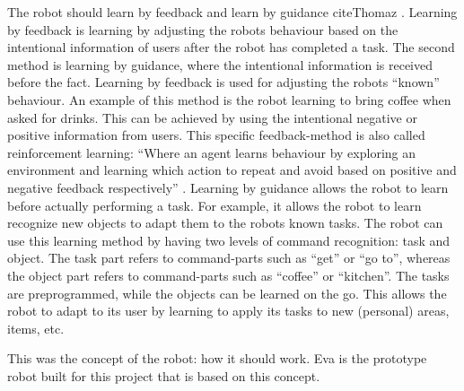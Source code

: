 \documentclass[project_eva.tex]{subfiles}
\begin{document}
The robot should learn by feedback and learn by guidance cite{Thomaz} . Learning by feedback is learning by adjusting the robot\textquotesingle s behaviour based on the intentional information of users after the robot has completed a task. The second method is learning by guidance, where the intentional information is received before the fact. Learning by feedback is used for adjusting the robot\textquotesingle s ``known'' behaviour. An example of this method is the robot learning to bring coffee when asked for drinks. This can be achieved by using the intentional negative or positive information from users.  This specific feedback-method is also called reinforcement learning: ``Where an agent learns behaviour by exploring an environment and learning which action to repeat and avoid based on positive and negative feedback respectively'' \cite{Joost}. 
Learning by guidance allows the robot to learn before actually performing a task. For example, it allows the robot to learn recognize new objects to adapt them to the robot\textquotesingle s known tasks. The robot can use this learning method by having two levels of command recognition: task and object. The task part refers to command-parts such as ``get'' or ``go to'', whereas the object part refers to command-parts such as ``coffee'' or ``kitchen''. The tasks are preprogrammed, while the objects can be learned on the go. This allows the robot to adapt to its user by learning to apply its tasks to new (personal) areas, items, etc. 

This was the concept of the robot: how it should work. Eva is the prototype robot built for this project that is based on this concept.
\end{document}

